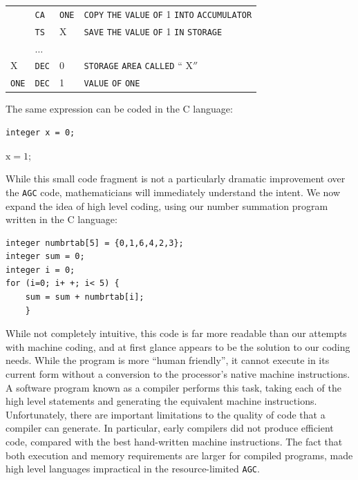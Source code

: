 \documentclass[refcap, oxford]{ahsan}
\begin{document}
\begin{center}
\begin{tabular}{llll}
 & \texttt{CA} & \texttt{ONE} & \texttt{COPY} \texttt{THE} \texttt{VALUE} \texttt{OF} 1 \texttt{INTO} \texttt{ACCUMULATOR} \\
 & \texttt{TS} & X & \texttt{SAVE} \texttt{THE} \texttt{VALUE} \texttt{OF} 1 \texttt{IN} \texttt{STORAGE} \\
 & $\ldots$ &  &  \\
X & \texttt{DEC} & 0 & \texttt{STORAGE} \texttt{AREA} \texttt{CALLED} `` $\mathrm{X} ''$ \\
\texttt{ONE} & \texttt{DEC} & 1 & \texttt{VALUE} \texttt{OF} \texttt{ONE} \\
\end{tabular}
\end{center}

The same expression can be coded in the C language:

\begin{verbatim}
integer x = 0;
\end{verbatim}

$\mathrm{x}=1$;

While this small code fragment is not a particularly dramatic improvement over the \texttt{AGC} code, mathematicians will immediately understand the intent. We now expand the idea of high level coding, using our number summation program written in the C language:

\begin{verbatim}
integer numbrtab[5] = {0,1,6,4,2,3};
integer sum = 0;
integer i = 0;
for (i=0; i+ +; i< 5) {
    sum = sum + numbrtab[i];
    }
\end{verbatim}

While not completely intuitive, this code is far more readable than our attempts with machine coding, and at first glance appears to be the solution to our coding needs. While the program is more ``human friendly'', it cannot execute in its current form without a conversion to the processor's native machine instructions. A software program known as a compiler performs this task, taking each of the high level statements and generating the equivalent machine instructions. Unfortunately, there are important limitations to the quality of code that a compiler can generate. In particular, early compilers did not produce efficient code, compared with the best hand-written machine instructions. The fact that both execution and memory requirements are larger for compiled programs, made high level languages impractical in the resource-limited \texttt{AGC}.
\end{document}
